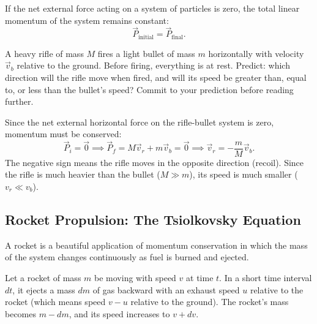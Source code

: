 \begin{keybox}
If the net external force acting on a system of particles is zero, the total linear momentum of the system remains constant:
\begin{equation}
    \vec{P}_{\text{initial}} = \vec{P}_{\text{final}}.
\end{equation}
\end{keybox}

\begin{predictbox}
A heavy rifle of mass $M$ fires a light bullet of mass $m$ horizontally with velocity $\vec{v}_b$ relative to the ground. Before firing, everything is at rest. 
Predict: which direction will the rifle move when fired, and will its speed be greater than, equal to, or less than the bullet's speed? Commit to your prediction before reading further.
\end{predictbox}

Since the net external horizontal force on the rifle-bullet system is zero, momentum must be conserved:
\begin{equation}
    \vec{P}_i = \vec{0} \implies \vec{P}_f = M\vec{v}_r + m\vec{v}_b = \vec{0} \implies \vec{v}_r = -\frac{m}{M}\vec{v}_b.
\end{equation}
The negative sign means the rifle moves in the opposite direction (recoil). Since the rifle is much heavier than the bullet ($M \gg m$), its speed is much smaller ($v_r \ll v_b$).

\subsection{Rocket Propulsion: The Tsiolkovsky Equation}

A rocket is a beautiful application of momentum conservation in which the mass of the system changes continuously as fuel is burned and ejected.

Let a rocket of mass $m$ be moving with speed $v$ at time $t$. In a short time interval $dt$, it ejects a mass $dm$ of gas backward with an exhaust speed $u$ relative to the rocket (which means speed $v - u$ relative to the ground). The rocket's mass becomes $m - dm$, and its speed increases to $v + dv$. 

